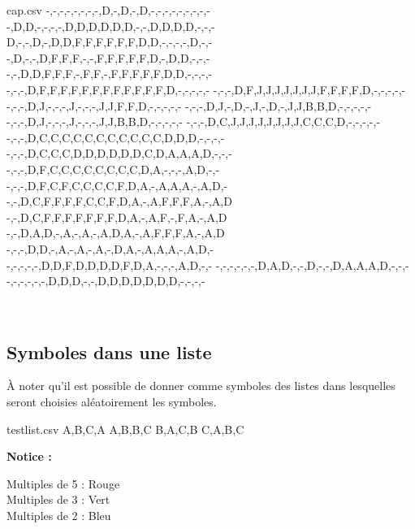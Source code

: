 \documentclass{article}
\begin{document}
\begin{PresentationCode}{}

\begin{filecontents*}[overwrite]{cap.csv}
	-,-,-,-,-,-,-,-,D,-,D,-,D,-,-,-,-,-,-,-,-,-
	-,D,D,-,-,-,-,D,D,D,D,D,D,-,-,D,D,D,D,-,-,-
	D,-,-,D,-,D,D,F,F,F,F,F,F,D,D,-,-,-,-,D,-,-
	-,D,-,-,D,F,F,F,-,-,F,F,F,F,F,D,-,D,D,-,-,-
	-,-,D,D,F,F,F,-,F,F,-,F,F,F,F,F,D,D,-,-,-,-
	-,-,-,D,F,F,F,F,F,F,F,F,F,F,F,F,D,-,-,-,-,-
	-,-,-,D,F,J,J,J,J,J,J,J,F,F,F,F,D,-,-,-,-,-
	-,-,-,D,J,-,-,-,J,-,-,-,J,J,F,F,D,-,-,-,-,-
	-,-,-,D,J,-,D,-,J,-,D,-,J,J,B,B,D,-,-,-,-,-
	-,-,-,D,J,-,-,-,J,-,-,-,J,J,B,B,D,-,-,-,-,-
	-,-,-,D,C,J,J,J,J,J,J,J,J,C,C,C,D,-,-,-,-,-
	-,-,-,D,C,C,C,C,C,C,C,C,C,C,C,D,D,D,-,-,-,-
	-,-,-,D,C,C,C,D,D,D,D,D,D,C,D,A,A,A,D,-,-,-
	-,-,-,D,F,C,C,C,C,C,C,C,C,D,A,-,-,-,A,D,-,-
	-,-,-,D,F,C,F,C,C,C,C,F,D,A,-,A,A,A,-,A,D,-
	-,-,D,C,F,F,F,F,C,C,F,D,A,-,A,F,F,F,A,-,A,D
	-,-,D,C,F,F,F,F,F,F,F,D,A,-,A,F,-,F,A,-,A,D
	-,-,D,A,D,-,A,-,A,-,A,D,A,-,A,F,F,F,A,-,A,D
	-,-,-,D,D,-,A,-,A,-,A,-,D,A,-,A,A,A,-,A,D,-
	-,-,-,-,-,D,D,F,D,D,D,D,F,D,A,-,-,-,A,D,-,-
	-,-,-,-,-,-,D,A,D,-,-,D,-,-,D,A,A,A,D,-,-,-
	-,-,-,-,-,-,D,D,D,-,-,D,D,D,D,D,D,D,-,-,-,-
\end{filecontents*}

~~
\end{PresentationCode}

\pagebreak

\subsection{Symboles dans une liste}

À noter qu'il est possible de donner comme symboles des listes dans lesquelles seront choisies aléatoirement les symboles.

\begin{PresentationCode}{}

\begin{filecontents*}[overwrite]{testlist.csv}
A,B,C,A
A,B,B,C
B,A,C,B
C,A,B,C
\end{filecontents*}

\textbf{Notice : }

Multiples de 5 : Rouge\\
Multiples de 3 : Vert\\
Multiples de 2 : Bleu

\hspace{5mm}
\hspace{5mm}
\end{PresentationCode}
\end{document}
